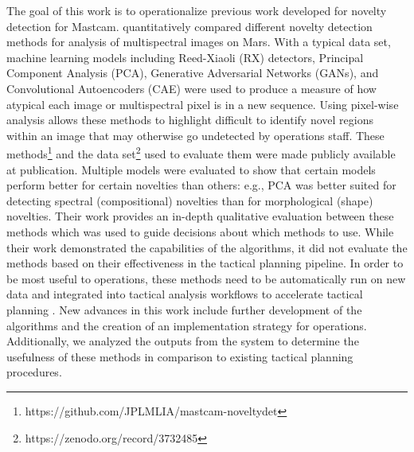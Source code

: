 The goal of this work is to operationalize previous work developed for novelty detection for Mastcam.
\cite{kerner2020comparison} quantitatively compared different novelty detection methods for analysis of multispectral images on Mars.
With a typical data set, machine learning models including Reed-Xiaoli (RX) detectors, Principal Component Analysis (PCA), Generative Adversarial Networks (GANs), and Convolutional Autoencoders (CAE) were used to produce a measure of how atypical each image or multispectral pixel is in a new sequence. 
Using pixel-wise analysis allows these methods to highlight difficult to identify novel regions within an image that may otherwise go undetected by operations staff.
These methods\footnote{https://github.com/JPLMLIA/mastcam-noveltydet} and the data set\footnote{https://zenodo.org/record/3732485} used to evaluate them were made publicly available at publication. 
Multiple models were evaluated to show that certain models perform better for certain novelties than others: e.g., PCA was better suited for detecting spectral (compositional) novelties than for morphological (shape) novelties. 
Their work provides an in-depth qualitative evaluation between these methods which was used to guide decisions about which methods to use. 
While their work demonstrated the capabilities of the algorithms, it did not evaluate the methods based on their effectiveness in the tactical planning pipeline.
In order to be most useful to operations, these methods need to be automatically run on new data and integrated into tactical analysis workflows to accelerate tactical planning \parencite{donahoe2020new}.
New advances in this work include further development of the algorithms and the creation of an implementation strategy for operations. 
Additionally, we analyzed the outputs from the system to determine the usefulness of these methods in comparison to existing tactical planning procedures. 


